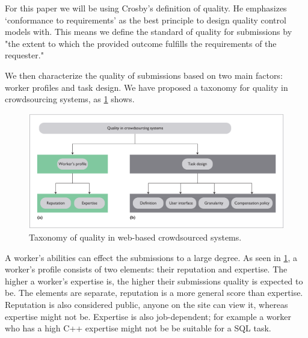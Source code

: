 \documentclass{sig-alternate-05-2015}
\begin{document}
	For this paper we will be using Crosby's definition of quality. \cite{crosby1996quality} He emphasizes `conformance to requirements' as the best principle to design quality control models with. This means we define the standard of quality for submissions by \\
	"the extent to which the provided outcome fulfills the requirements of the requester."
	
	We then characterize the quality of submissions based on two main factors: worker profiles and task design. We have proposed a taxonomy for quality in crowdsourcing systems, as \cref{fig-taxonomy} shows.
	
	\begin{figure}[h]
		\includegraphics[width=\textwidth]{taxonomy}
		\caption{Taxonomy of quality in web-based crowdsourced systems.}
		\label{fig-taxonomy}
	\end{figure}
	
	A worker's abilities can effect the submissions to a large degree. \cite{khazankin2012predicting} As seen in \cref{fig-taxonomy}, a worker's profile consists of two elements: their reputation and expertise. The higher a worker's expertise is, the higher their submissions quality is expected to be. The elements are separate, reputation is a more general score than expertise. Reputation is also considered public, anyone on the site can view it, whereas expertise might not be. Expertise is also job-dependent; for example a worker who has a high C++ expertise might not be be suitable for a SQL task. 
	
\end{document}
